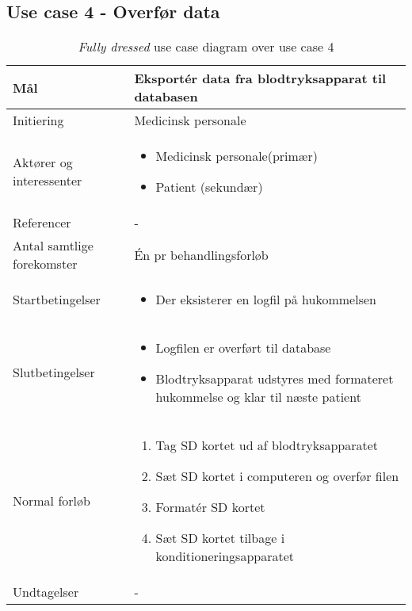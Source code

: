 	\subsection{Use case 4 - Overfør data}
	\begin{table}[H]
		\begin{center}
			\begin{tabular}{ | p{} | p{}| } 
				\hline
				Mål & Eksportér data fra blodtryksapparat til databasen\\ 
				\hline
				Initiering &  Medicinsk personale\\
				\hline
				Aktører og interessenter & 
				\begin{itemize}
					\item Medicinsk personale(primær)
					\item Patient (sekundær)
				\end{itemize} \\ 
				\hline
				Referencer & - \\ 
				\hline
				Antal samtlige forekomster & Én pr behandlingsforløb \\ 
				\hline	
				Startbetingelser & 
				\begin{itemize}
					\item Der eksisterer en logfil på hukommelsen
				\end{itemize} \\ 
				\hline
				Slutbetingelser & 
				\begin{itemize}
					\item Logfilen er overført til database
					\item Blodtryksapparat udstyres med formateret hukommelse og klar til næste patient
				\end{itemize} \\ 
				\hline
				Normal forløb & \begin{enumerate}
					\setlength\itemsep{0cm} %
					\item Tag SD kortet ud af blodtryksapparatet 
					\item Sæt SD kortet i computeren og overfør filen 
					\item Formatér SD kortet
					\item Sæt SD kortet tilbage i konditioneringsapparatet 
				\end{enumerate} \\ 
				\hline
				Undtagelser & -\\ 
				\hline
			\end{tabular}
		\end{center}
		
			\caption{\textit{Fully dressed} use case diagram over use case 4}
		\end{table}
			\newpage